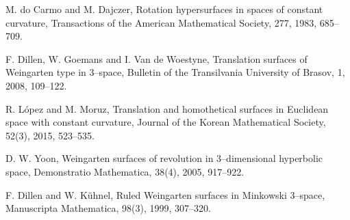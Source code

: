 \documentclass{amsart}
\theoremstyle{definition}
\numberwithin{equation}{section}
\begin{document}
\begin{thebibliography}{}
M. do Carmo and M. Dajczer, 
Rotation hypersurfaces in spaces of constant curvature, Transactions of the American Mathematical Society, 
277, 1983, 685--709.



F. Dillen, W. Goemans and I. Van de Woestyne, 
Translation surfaces of Weingarten type in 3--space, 
Bulletin of the Transilvania University of Brasov, 
1, 2008, 109--122.

R. L\'{o}pez and M. Moruz, 
Translation and homothetical surfaces in Euclidean space with constant curvature, 
Journal of the Korean Mathematical Society, 
52(3), 2015, 523--535.

D. W. Yoon, 
Weingarten surfaces of revolution in 3--dimensional hyperbolic space, 
Demonstratio Mathematica, 38(4), 2005, 917--922.

F. Dillen and W. K\"{u}hnel, 
Ruled Weingarten surfaces in Minkowski 3--space,
Manuscripta Mathematica, 98(3), 1999, 307--320.
\end{thebibliography}
\end{document}
